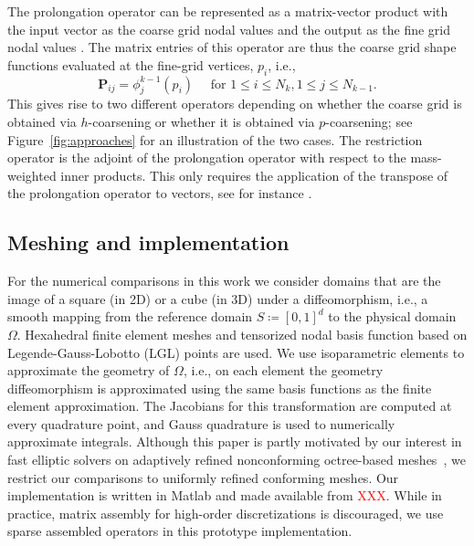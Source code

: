 \documentclass[smallcondensed,final]{svjour3}     %
\newcommand{\todo}[1]{\textcolor{red}{ #1}}
\begin{document}
The prolongation operator can be represented as a matrix-vector
product with the input vector as the coarse grid nodal values and the
output as the fine grid nodal values \cite{SampathBiros10}. The matrix
entries of this operator are thus the coarse grid shape functions evaluated at the fine-grid
vertices, $p_i$, i.e.,
\begin{equation}
	\label{eq:Pstencil}
	\mathbf P_{\!ij} = \phi_j^{k-1}(p_i) \quad \text{ for } 1\le i \le N_k, 1\le j\le N_{k-1}. 
\end{equation}
This gives rise to two different operators depending on whether the
coarse grid is obtained via $h$-coarsening or whether it is obtained
via $p$-coarsening; see Figure~\ref{fig:approaches} for an
illustration of the two cases. The restriction operator is the adjoint
of the prolongation operator with respect to the mass-weighted inner
products. This only requires the application of the transpose of the
prolongation operator to vectors, see for instance
\cite{SampathBiros10}.


\subsection{Meshing and implementation} %
\label{sub:meshing}

For the numerical comparisons in this work we consider domains that
are the image of a square (in 2D) or a cube (in 3D) under a
diffeomorphism, i.e., a smooth mapping from the reference domain
$S\coloneqq[0,1]^d$ to the physical domain $\Omega$. Hexahedral finite
element meshes and tensorized nodal basis function based on
Legende-Gauss-Lobotto (LGL) points are used.  We use isoparametric
elements to approximate the geometry of $\Omega$, i.e., on each element the geometry
diffeomorphism is approximated using the same basis
functions as the
finite element approximation. The Jacobians for this transformation
are computed at every quadrature point, and Gauss quadrature is used
to numerically approximate integrals.  Although this paper is partly
motivated by our interest in fast elliptic solvers on adaptively
refined nonconforming octree-based
meshes~\cite{SundarBirosBursteddeEtAl12, SampathBiros10}, 
we restrict our comparisons to uniformly refined conforming meshes.
%
Our implementation is written in Matlab and made available from
\todo{XXX}. While in practice, matrix assembly for
high-order discretizations is discouraged, we use sparse
assembled operators in this prototype implementation.
\end{document}
